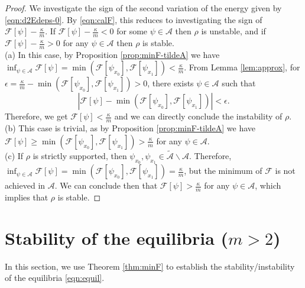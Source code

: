 \documentclass[11pt]{amsart}
\begin{document}
\begin{proof}
We investigate the sign of the second variation of the energy given by \eqref{eqn:d2Edeps-0}. By \eqref{eqn:calF}, this reduces to investigating the sign of $\mathcal{F}[\psi]-\frac{\kappa}{m}$. If $\mathcal{F}[\psi]-\frac{\kappa}{m}<0$ for some $\psi \in\mathcal{A}$ then $\rho$ is unstable, and if $\mathcal{F}[\psi]-\frac{\kappa}{m}>0$ for any $\psi \in\mathcal{A}$ then $\rho$ is stable. \\

\noindent(a) In this case, by Proposition \ref{prop:minF-tildeA} we have $\inf_{\psi \in\mathcal{A}}\mathcal{F}[\psi]=\min(\mathcal{F}[\psi_{x_0}],\mathcal{F}[\psi_{x_1}])<\frac{\kappa}{m}$. From Lemma \ref{lem:approx}, for $\epsilon=\frac{\kappa}{m}-\min(\mathcal{F}[\psi_{x_0}],\mathcal{F}[\psi_{x_1}])>0$, there exists $\psi \in\mathcal{A}$ such that
\[
\left|\mathcal{F}[\psi]-\min(\mathcal{F}[\psi_{x_0}],\mathcal{F}[\psi_{x_1}])\right|<\epsilon.
\]
Therefore, we get $\mathcal{F}[\psi]<\frac{\kappa}{m}$ and we can directly conclude the instability of $\rho$.\\

\noindent(b) This case is trivial, as by Proposition \ref{prop:minF-tildeA} we have $\mathcal{F}[\psi]\geq\min(\mathcal{F}[\psi_{x_0}],\mathcal{F}[\psi_{x_1}])>\frac{\kappa}{m}$ for any $\psi \in\mathcal{A}$. \\

\noindent(c) If $\rho$ is strictly supported, then $\psi_{x_0}, \psi_{x_1}\in\tilde{\mathcal{A}}\backslash\mathcal{A}$. Therefore, $\inf_{\psi \in\mathcal{A}}\mathcal{F}[\psi]=\min(\mathcal{F}[\psi_{x_0}],\mathcal{F}[\psi_{x_1}])=\frac{\kappa}{m}$, but the minimum of $\mathcal{F}$ is not achieved in $\mathcal{A}$. We can conclude then that $\mathcal{F}[\psi]>\frac{\kappa}{m}$ for any $\psi \in\mathcal{A}$, which implies that $\rho$ is stable. 
\end{proof}



\section{Stability of the equilibria ($m>2$)}
\label{sect:2ndorder-fscs}
In this section, we use Theorem \ref{thm:minF} to establish the stability/instability of the equilibria \eqref{eqn:equil}. 
\end{document}
